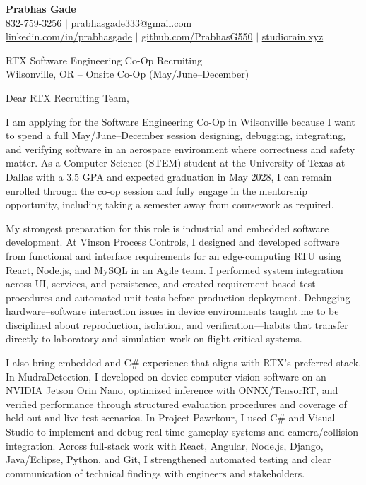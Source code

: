 \documentclass[letterpaper,11pt]{letter}
\begin{document}
\begin{flushleft}
\textbf{\large Prabhas Gade}\\
832-759-3256 $|$ \href{mailto:prabhasgade333@gmail.com}{prabhasgade333@gmail.com}\\
\href{https://linkedin.com/in/prabhasgade}{linkedin.com/in/prabhasgade} $|$
\href{https://github.com/PrabhasG550}{github.com/PrabhasG550} $|$
\href{https://studiorain.xyz}{studiorain.xyz}
\end{flushleft}

\vspace{6pt}
\begin{flushleft}
RTX Software Engineering Co-Op Recruiting\\
Wilsonville, OR -- Onsite Co-Op (May/June--December)
\end{flushleft}

Dear RTX Recruiting Team,

I am applying for the Software Engineering Co-Op in Wilsonville because I want to spend a full May/June--December session designing, debugging, integrating, and verifying software in an aerospace environment where correctness and safety matter. As a Computer Science (STEM) student at the University of Texas at Dallas with a 3.5 GPA and expected graduation in May 2028, I can remain enrolled through the co-op session and fully engage in the mentorship opportunity, including taking a semester away from coursework as required.

My strongest preparation for this role is industrial and embedded software development. At Vinson Process Controls, I designed and developed software from functional and interface requirements for an edge-computing RTU using React, Node.js, and MySQL in an Agile team. I performed system integration across UI, services, and persistence, and created requirement-based test procedures and automated unit tests before production deployment. Debugging hardware--software interaction issues in device environments taught me to be disciplined about reproduction, isolation, and verification---habits that transfer directly to laboratory and simulation work on flight-critical systems.

I also bring embedded and C\# experience that aligns with RTX's preferred stack. In MudraDetection, I developed on-device computer-vision software on an NVIDIA Jetson Orin Nano, optimized inference with ONNX/TensorRT, and verified performance through structured evaluation procedures and coverage of held-out and live test scenarios. In Project Pawrkour, I used C\# and Visual Studio to implement and debug real-time gameplay systems and camera/collision integration. Across full-stack work with React, Angular, Node.js, Django, Java/Eclipse, Python, and Git, I strengthened automated testing and clear communication of technical findings with engineers and stakeholders.
\end{document}
